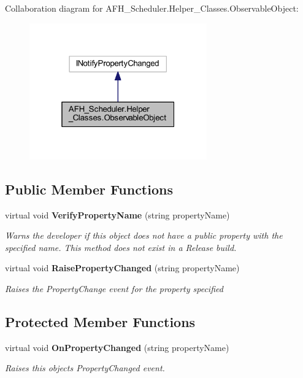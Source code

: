 Collaboration diagram for A\+F\+H\+\_\+\+Scheduler.\+Helper\+\_\+\+Classes.\+Observable\+Object\+:
\nopagebreak
\begin{figure}[H]
\begin{center}
\leavevmode
\includegraphics[width=217pt]{class_a_f_h___scheduler_1_1_helper___classes_1_1_observable_object__coll__graph}
\end{center}
\end{figure}
\subsection*{Public Member Functions}
\begin{DoxyCompactItemize}
\item 
virtual void \textbf{ Verify\+Property\+Name} (string property\+Name)
\begin{DoxyCompactList}\small\item\em Warns the developer if this object does not have a public property with the specified name. This method does not exist in a Release build. \end{DoxyCompactList}\item 
virtual void \textbf{ Raise\+Property\+Changed} (string property\+Name)
\begin{DoxyCompactList}\small\item\em Raises the Property\+Change event for the property specified \end{DoxyCompactList}\end{DoxyCompactItemize}
\subsection*{Protected Member Functions}
\begin{DoxyCompactItemize}
\item 
virtual void \textbf{ On\+Property\+Changed} (string property\+Name)
\begin{DoxyCompactList}\small\item\em Raises this object\textquotesingle{}s Property\+Changed event. \end{DoxyCompactList}\end{DoxyCompactItemize}
